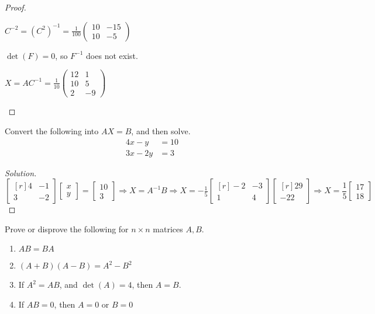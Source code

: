 \begin{proof}
\begin{enumerate}
\begin{multicols}{2}
        \item $C^{-2} = (C^2)^{-1} = \frac{1}{100}\begin{pmatrix}10 & -15 \\ 10 & -5\end{pmatrix}$
        \item $\det(F) = 0$, so $F^{-1}$ does not exist. 
        \item $X = AC^{-1} = \frac{1}{10}\begin{pmatrix}12 & 1\\10 & 5\\ 2 & -9\end{pmatrix}$
    \end{multicols}    
    \end{enumerate}
    \end{proof}
    \clearpage
    \begin{problem}
    Convert the following into $AX = B$, and then solve.
    \begin{align*}
        4x - y &= 10\\
        3x - 2y &= 3
    \end{align*}
    \end{problem}
    \begin{proof}[Solution]
    \vspace{-\topsep}
    \begin{equation*}
        \begin{bmatrix*}[r]4&-1\\3&-2\end{bmatrix*}\begin{bmatrix}x\\y\end{bmatrix}=\begin{bmatrix}10\\3\end{bmatrix}\Rightarrow X=A^{-1}B\Rightarrow X=-\tfrac{1}{5}\begin{bmatrix*}[r]-2&-3\\1&4\end{bmatrix*}\begin{bmatrix*}[r]29\\-22\end{bmatrix*}\Rightarrow X=\frac{1}{5}\begin{bmatrix}17\\18\end{bmatrix}
    \end{equation*}
    \end{proof}
    \begin{problem}
    Prove or disprove the following for $n\times n$ matrices $A, B$.
    \begin{enumerate}
        \item $AB = BA$
        \item $(A+B)(A-B) = A^2 - B^2$
        \item If $A^2 = AB$, and $\det(A) = 4$, then $A=B$.
        \item If $AB = 0$, then $A=0$ or $B=0$
    \end{enumerate}
    \end{problem}
